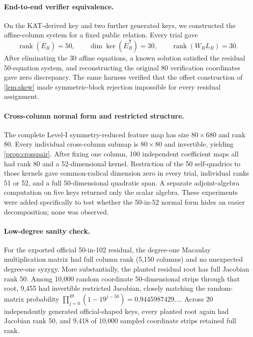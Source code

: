 \documentclass[runningheads]{llncs}
\newcommand{\rank}{\operatorname{rank}}
\newcommand{\transpose}{\mathsf T}
\begin{document}
\paragraph{End-to-end verifier equivalence.}
On the KAT-derived key and two further generated keys, we constructed the affine-column system for a fixed public relation.  Every trial gave
\[
 \rank(\overline E_R)=50,
 \qquad \dim\ker(\overline E_R^\transpose)=30,
 \qquad \rank(W_RL_R)=30.
\]
After eliminating the 30 affine equations, a known solution satisfied the residual 50-equation system, and reconstructing the original 80 verification coordinates gave zero discrepancy.  The same harness verified that the offset construction of \cref{lem:skew} made symmetric-block rejection impossible for every residual assignment.

\paragraph{Cross-column normal form and restricted structure.}
The complete Level-I symmetry-reduced feature map has size $80\times680$ and rank 80.  Every individual cross-column submap is $80\times80$ and invertible, yielding \cref{prop:crosspair}.  After fixing one column, 100 independent coefficient maps all had rank 80 and a 52-dimensional kernel.  Restriction of the 50 self-quadrics to those kernels gave common-radical dimension zero in every trial, individual ranks 51 or 52, and a full 50-dimensional quadratic span.  A separate adjoint-algebra computation on five keys returned only the scalar algebra.  These experiments were added specifically to test whether the 50-in-52 normal form hides an easier decomposition; none was observed.

\paragraph{Low-degree sanity check.}
For the exported official 50-in-102 residual, the degree-one Macaulay
multiplication matrix had full column rank (5,150 columns) and no unexpected
degree-one syzygy.  More substantially, the planted residual root has full
Jacobian rank 50.  Among 10,000 random coordinate 50-dimensional strips through
that root, 9,455 had invertible restricted Jacobian, closely matching the
random-matrix probability $\prod_{j=0}^{49}(1-19^{j-50})=0.9445987429\ldots$.
Across 20 independently generated official-shaped keys, every planted root again
had Jacobian rank 50, and 9,418 of 10,000 sampled coordinate strips retained
full rank.
\end{document}
